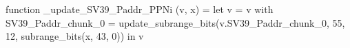 function _update_SV39_Paddr_PPNi (v, x) = let v = { v with SV39_Paddr_chunk_0 = update_subrange_bits(v.SV39_Paddr_chunk_0, 55, 12, subrange_bits(x, 43, 0)) } in
  v
